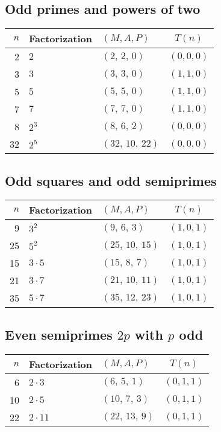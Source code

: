 \documentclass[11pt,a4paper]{article}
\numberwithin{equation}{section}
\numberwithin{figure}{section}
\numberwithin{table}{section}
\theoremstyle{plain}
\theoremstyle{definition}
\theoremstyle{remark}
\begin{document}
\subsection*{Odd primes and powers of two}
\begin{center}
\begin{tabular}{r l l c}
\toprule
\(n\) & Factorization & \((M,A,P)\) & \(T(n)\) \\
\midrule
2  & \(2\)       & \((2,\,2,\,0)\)     & \((0,0,0)\) \\
3  & \(3\)       & \((3,\,3,\,0)\)     & \((1,1,0)\) \\
5  & \(5\)       & \((5,\,5,\,0)\)     & \((1,1,0)\) \\
7  & \(7\)       & \((7,\,7,\,0)\)     & \((1,1,0)\) \\
8  & \(2^3\)     & \((8,\,6,\,2)\)     & \((0,0,0)\) \\
32 & \(2^5\)     & \((32,\,10,\,22)\)  & \((0,0,0)\) \\
\bottomrule
\end{tabular}
\end{center}

\subsection*{Odd squares and odd semiprimes}
\begin{center}
\begin{tabular}{r l l c}
\toprule
\(n\) & Factorization & \((M,A,P)\) & \(T(n)\) \\
\midrule
9   & \(3^2\)     & \((9,\,6,\,3)\)    & \((1,0,1)\) \\
25  & \(5^2\)     & \((25,\,10,\,15)\) & \((1,0,1)\) \\
15  & \(3\cdot 5\)  & \((15,\,8,\,7)\)   & \((1,0,1)\) \\
21  & \(3\cdot 7\)  & \((21,\,10,\,11)\) & \((1,0,1)\) \\
35  & \(5\cdot 7\)  & \((35,\,12,\,23)\) & \((1,0,1)\) \\
\bottomrule
\end{tabular}
\end{center}

\subsection*{Even semiprimes \(2p\) with \(p\) odd}
\begin{center}
\begin{tabular}{r l l c}
\toprule
\(n\) & Factorization & \((M,A,P)\) & \(T(n)\) \\
\midrule
6   & \(2\cdot 3\)   & \((6,\,5,\,1)\)  & \((0,1,1)\) \\
10  & \(2\cdot 5\)   & \((10,\,7,\,3)\) & \((0,1,1)\) \\
22  & \(2\cdot 11\)  & \((22,\,13,\,9)\) & \((0,1,1)\) \\
\bottomrule
\end{tabular}
\end{center}
\end{document}

